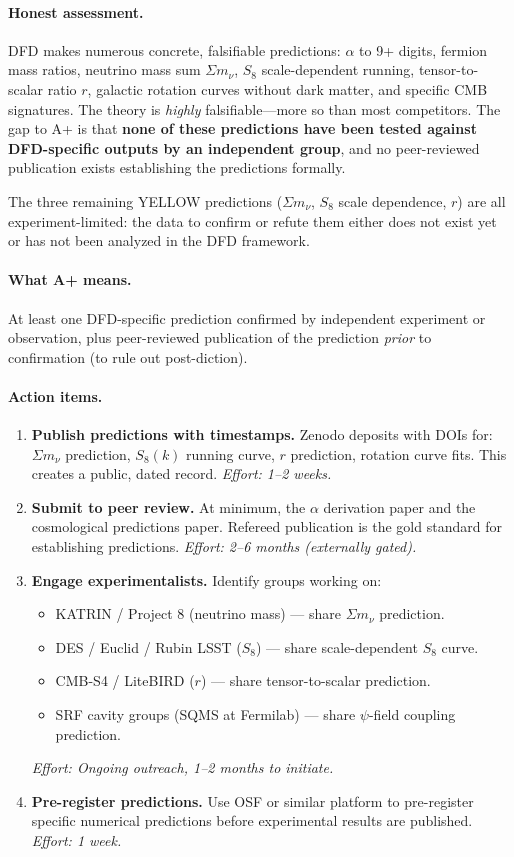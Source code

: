 \documentclass[11pt,a4paper]{article}
\begin{document}
\paragraph{Honest assessment.}
DFD makes numerous concrete, falsifiable predictions: $\alpha$ to 9+ digits, fermion mass ratios, neutrino mass sum $\Sigma m_\nu$, $S_8$ scale-dependent running, tensor-to-scalar ratio $r$, galactic rotation curves without dark matter, and specific CMB signatures. The theory is \emph{highly} falsifiable---more so than most competitors. The gap to A+ is that \textbf{none of these predictions have been tested against DFD-specific outputs by an independent group}, and no peer-reviewed publication exists establishing the predictions formally.

The three remaining YELLOW predictions ($\Sigma m_\nu$, $S_8$ scale dependence, $r$) are all experiment-limited: the data to confirm or refute them either does not exist yet or has not been analyzed in the DFD framework.

\paragraph{What A+ means.}
At least one DFD-specific prediction confirmed by independent experiment or observation, plus peer-reviewed publication of the prediction \emph{prior} to confirmation (to rule out post-diction).

\paragraph{Action items.}
\begin{enumerate}
    \item \textbf{Publish predictions with timestamps.} Zenodo deposits with DOIs for: $\Sigma m_\nu$ prediction, $S_8(k)$ running curve, $r$ prediction, rotation curve fits. This creates a public, dated record. \emph{Effort: 1--2 weeks.}
    \item \textbf{Submit to peer review.} At minimum, the $\alpha$ derivation paper and the cosmological predictions paper. Refereed publication is the gold standard for establishing predictions. \emph{Effort: 2--6 months (externally gated).}
    \item \textbf{Engage experimentalists.} Identify groups working on:
    \begin{itemize}
        \item KATRIN / Project 8 (neutrino mass) --- share $\Sigma m_\nu$ prediction.
        \item DES / Euclid / Rubin LSST ($S_8$) --- share scale-dependent $S_8$ curve.
        \item CMB-S4 / LiteBIRD ($r$) --- share tensor-to-scalar prediction.
        \item SRF cavity groups (SQMS at Fermilab) --- share $\psi$-field coupling prediction.
    \end{itemize}
    \emph{Effort: Ongoing outreach, 1--2 months to initiate.}
    \item \textbf{Pre-register predictions.} Use OSF or similar platform to pre-register specific numerical predictions before experimental results are published. \emph{Effort: 1 week.}
\end{enumerate}
\end{document}
